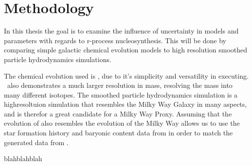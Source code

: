 \section{Methodology}

In this thesis the goal is to examine the influence of uncertainty in models and parameters
with regards to r-process nucleosynthesis. This will be done by comparing simple galactic chemical evolution models to high resolution smoothed particle hydrodynamics simulations.

The chemical evolution used is \omegamodel, due to it's simplicity and versatility in executing. \omegamodel\ also demonstrates a much larger resolution in mass, resolving the mass into many different isotopes.
The smoothed particle hydrodynamics simulation \eris is a highresoltuion simulation that resembles the Milky Way Galaxy in many aspects, and is therefor a great candidate for a Milky Way Proxy. Assuming that the evolution of \eris also resembles the evolution of the Milky Way allows us to use the star formation history and baryonic content data from \eris in order to match the generated data from \omegamodel.

blahblahblah

